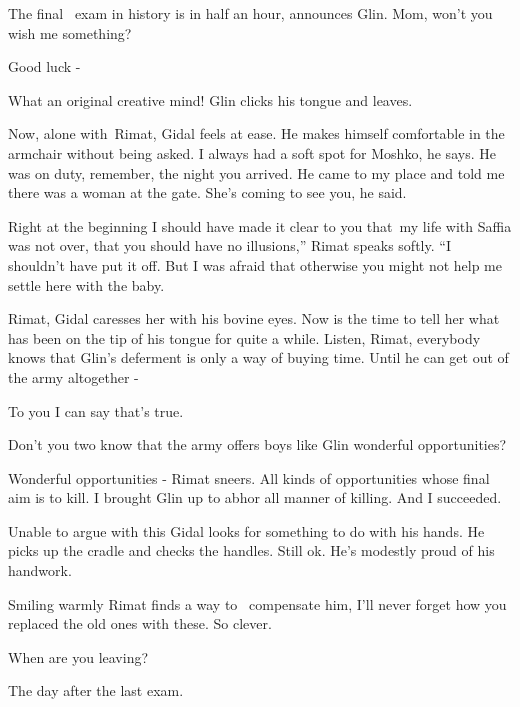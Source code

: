 \documentclass[letterpaper]{article}
\begin{document}
{\textquotedbl}The final \ exam in history is in half an hour,{\textquotedbl} announces Glin. {\textquotedbl}Mom, won't
you wish me something?{\textquotedbl} 

{\textquotedbl}Good luck -{\textquotedbl} 

{\textquotedbl}What an original creative mind!{\textquotedbl} Glin clicks his tongue and leaves.

Now, alone with~Rimat, Gidal feels at ease. He makes himself comfortable in the armchair without being asked.
{\textquotedbl}I always had a soft spot for Moshko,{\textquotedbl} he says. {\textquotedbl}He was on duty, remember,
the night you arrived. He came to my place and told me there was a woman at the gate. She's coming to see you, he
said.{\textquotedbl} 

{\textquotedbl}Right at the beginning I should have made it clear to you that~my life with Saffia was not over, that you
should have no illusions,'' Rimat speaks softly. ``I shouldn't have put it off. But I was afraid that otherwise you
might not help me settle here with the baby.{\textquotedbl} 

{\textquotedbl}Rimat,{\textquotedbl} Gidal caresses her with his bovine eyes. Now is the time to tell her what has been
on the tip of his tongue for quite\textcolor{red}{ }a while. {\textquotedbl}Listen, Rimat, everybody knows that Glin's
deferment is only a way of buying time. Until he can get out of the army altogether -{\textquotedbl} 

{\textquotedbl}To you I can say that's true.{\textquotedbl} 

{\textquotedbl}Don't you two know that the army offers boys like Glin wonderful opportunities?{\textquotedbl} 

{\textquotedbl}Wonderful opportunities -{\textquotedbl} Rimat sneers. {\textquotedbl}All kinds of opportunities whose
final aim is to kill. I brought Glin up to abhor all manner of killing. And I succeeded.{\textquotedbl}

Unable to argue with this Gidal looks for something to do with his hands. He picks up the cradle and checks the handles.
Still ok. He's modestly proud of his handwork. 

Smiling warmly Rimat finds a way to \ compensate him, {\textquotedbl}I'll never forget how you replaced the old ones
with these. So clever.{\textquotedbl} 

{\textquotedbl}When are you leaving?{\textquotedbl} 

{\textquotedbl}The day after the last exam.{\textquotedbl} 
\end{document}
